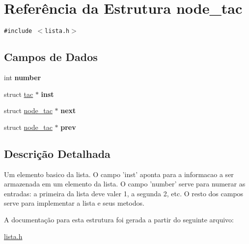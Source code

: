 \hypertarget{structnode__tac}{
\section{Referência da Estrutura node\_\-tac}
\label{structnode__tac}
}
{\tt \#include $<$lista.h$>$}

\subsection*{Campos de Dados}
\begin{CompactItemize}
\item 
\hypertarget{structnode__tac_3e2a832fdd27eb57b94b015adea69fcf}{
int \textbf{number}}
\label{structnode__tac_3e2a832fdd27eb57b94b015adea69fcf}

\item 
\hypertarget{structnode__tac_30e49a29ec5242fba75f64e739cd8539}{
struct \hyperlink{structtac}{tac} $\ast$ \textbf{inst}}
\label{structnode__tac_30e49a29ec5242fba75f64e739cd8539}

\item 
\hypertarget{structnode__tac_a67e7998f0070fc240f79534788b7587}{
struct \hyperlink{structnode__tac}{node\_\-tac} $\ast$ \textbf{next}}
\label{structnode__tac_a67e7998f0070fc240f79534788b7587}

\item 
\hypertarget{structnode__tac_7ffb36df18c662a79e17e0c01d630aff}{
struct \hyperlink{structnode__tac}{node\_\-tac} $\ast$ \textbf{prev}}
\label{structnode__tac_7ffb36df18c662a79e17e0c01d630aff}

\end{CompactItemize}


\subsection{Descrição Detalhada}
Um elemento basico da lista. O campo 'inst' aponta para a informacao a ser armazenada em um elemento da lista. O campo 'number' serve para numerar as entradas: a primeira da lista deve valer 1, a segunda 2, etc. O resto dos campos serve para implementar a lista e seus metodos. 

A documentação para esta estrutura foi gerada a partir do seguinte arquivo:\begin{CompactItemize}
\item 
\hyperlink{lista_8h}{lista.h}\end{CompactItemize}
